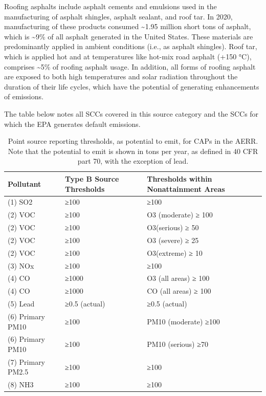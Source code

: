 \documentclass[
  11pt,
  oneside]{book}
\begin{document}
Roofing asphalts include asphalt cements and emulsions used in the manufacturing of asphalt shingles, asphalt sealant, and roof tar. In 2020, manufacturing of these products consumed \textasciitilde1.95 million short tons of asphalt, which is \textasciitilde9\% of all asphalt generated in the United States. These materials are predominantly applied in ambient conditions (i.e., as asphalt shingles). Roof tar, which is applied hot and at temperatures like hot-mix road asphalt (+150 °C), comprises \textasciitilde5\% of roofing asphalt usage. In addition, all forms of roofing asphalt are exposed to both high temperatures and solar radiation throughout the duration of their life cycles, which have the potential of generating enhancements of emissions.

The table below notes all SCCs covered in this source category and the SCCs for which the EPA generates default emissions.

\begin{table}

\caption{\label{tab:point-thres}Point source reporting thresholds, as potential to emit, for CAPs in the AERR. Note that the potential to emit is shown in tons per year, as defined in 40 CFR part 70, with the exception of lead.}
\centering
\begin{tabular}[t]{lll}
\toprule
Pollutant & Type B Source Thresholds & Thresholds within Nonattainment Areas\\
\midrule
(1) SO2 & ≥100 & ≥100\\
(2) VOC & ≥100 & O3 (moderate) ≥ 100\\
(2) VOC & ≥100 & O3(serious) ≥ 50\\
(2) VOC & ≥100 & O3 (severe) ≥ 25\\
(2) VOC & ≥100 & O3(extreme) ≥ 10\\
\addlinespace
(3) NOx & ≥100 & ≥100\\
(4) CO & ≥1000 & O3 (all areas) ≥ 100\\
(4) CO & ≥1000 & CO (all areas) ≥ 100\\
(5) Lead & ≥0.5 (actual) & ≥0.5 (actual)\\
(6) Primary PM10 & ≥100 & PM10 (moderate) ≥100\\
\addlinespace
(6) Primary PM10 & ≥100 & PM10 (serious) ≥70\\
(7) Primary PM2.5 & ≥100 & ≥100\\
(8) NH3 & ≥100 & ≥100\\
\bottomrule
\end{tabular}
\end{table}
\end{document}
